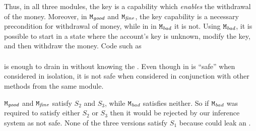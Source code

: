 \begin{example}
Thus, in all three modules, the key is a capability which \emph{enables} the withdrawal of the money. 
Moreover, in $\mbox{\normalfont{\texttt{M}}}_{{\textit{good}}}$ and $\mbox{\normalfont{\texttt{M}}}_{{\textit{fine}}}$, the key capability
is a necessary precondition for withdrawal of money, while in %
 in $\mbox{\normalfont{\texttt{M}}}_{{\textit{bad}}}$ it is not. %
Using $\mbox{\normalfont{\texttt{M}}}_{{\textit{bad}}}$, it is possible to start in a state where the account's key is unknown, modify the key, and then withdraw the money. 
Code   such as 
\\ 
$\ \strut \hspace{.2in} $  
\\ 
is enough to drain   in \ModB without knowing the \password.
Even though   in  \ModB is ``safe'' when considered in isolation, it is not safe when considered in conjunction with other methods from the same module. 

$\mbox{\normalfont{\texttt{M}}}_{{\textit{good}}}$ and $\mbox{\normalfont{\texttt{M}}}_{{\textit{fine}}}$ satisfy $S_2$ and $S_3$, while $\mbox{\normalfont{\texttt{M}}}_{{\textit{bad}}}$ satisfies neither. 
So if $\mbox{\normalfont{\texttt{M}}}_{{\textit{bad}}}$ was required to satisfy either $S_2$ or $S_3$ %
then it would  be rejected by our inference system as not safe.
None of the three versions satisfy $S_1$ because   could leak %
an .

\end{example}
 


